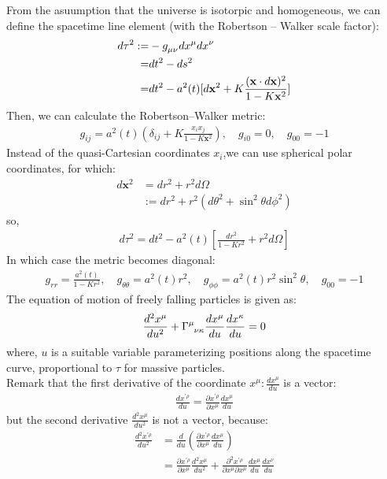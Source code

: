 \documentclass[11pt,a4paper,dvipdfmx]{jsarticle}
\theoremstyle{plain}
\theoremstyle{break}
\newcommand{\mbx}{\mathbf{x}}
\newcommand{\tensorGamma}[1]{\tensor{\Gamma}{ #1}}
\newcommand{\tensorg}[1]{\tensor{g}{ #1}}
\def\odi#1#2{\frac{d #1}{d #2}} %
\def\todi#1#2{\frac{d^{2} #1}{d #2^{2}}} %
\newcommand{\pdi}[2]{\frac{\partial #1}{\partial #2}}%
\begin{document}
From the asuumption that the universe is isotorpic and homogeneous,
we can define the spacetime line element
(with the Robertson – Walker scale factor):
\begin{align}
  d\tau^2
  :=& - \tensorg{_{\mu\nu}}dx^\mu dx^\nu \\
  =& dt^2 - ds^2 \\
  =& dt^2 - a^2(t) [d\mbx^2 + K\frac{(\mbx\cdot d\mbx)^2}{1-K\mbx^2}]
\end{align}
Then, we can calculate the Robertson–Walker metric:
\begin{align}
  g_{ij} = a^2(t)(\delta_{ij} + K\frac{x_i x_j}{1-K\mbx^2}),\quad g_{i0}=0,\quad g_{00} = -1
\end{align}
Instead of the quasi-Cartesian coordinates $x_i$,we can use spherical polar coordinates, for which:
\begin{align}
  d\mbx^2
  &= dr^2 + r^2 d\Omega\\
  &:= dr^2 + r^2(d\theta^2 + \sin^2\theta d\phi^2)
\end{align}
so,
\begin{align}
  d\tau^2 = dt^2 - a^2(t)[\frac{dr^2}{1-Kr^2} + r^2 d\Omega]
\end{align}
In which case the metric becomes diagonal:
\begin{align}
  g_{rr} = \frac{a^2(t)}{1-Kr^2},\quad g_{\theta\theta}= a^2(t)r^2,\quad g_{\phi\phi}= a^2(t)r^2 \sin^2\theta, \quad g_{00} = -1
\end{align}
The equation of motion of freely falling particles is given as:
\begin{align}
  \frac{d^2 x^\mu}{du^2} + \tensorGamma{^\mu_{\nu\kappa}} \frac{dx^\mu}{du}\frac{dx^\kappa}{du} = 0
  \label{eq:geodesic-equation}
\end{align}
where, $u$ is  a suitable variable parameterizing positions along the spacetime curve, proportional to $\tau$ for massive particles. \\%
Remark that the first derivative of the coordinate $x^\mu :\frac{dx^\mu}{du}$ is a vector:
\begin{align}
  \frac{dx^{\prime \rho}}{du} = \frac{\partial x^{\prime \rho}}{\partial x^\mu}\frac{dx^\mu}{du}
\end{align}
but the second derivative $\todi{x^\mu}{u}$  is not a vector, because:
\begin{align}
  \todi{x^{\prime \rho}}{u}
  &= \frac{d}{du}(\pdi{x^{\prime \rho}}{x^\mu} \odi{x^\mu}{u})\\
  &= \pdi{x^{\prime \rho}}{x^\mu} \todi{x^\mu}{u} + \frac{\partial^2 x^{\prime \rho}}{\partial x^\mu \partial x^\mu} \frac{d x^\mu}{du}\frac{dx^\nu}{du}
\end{align}
\end{document}
